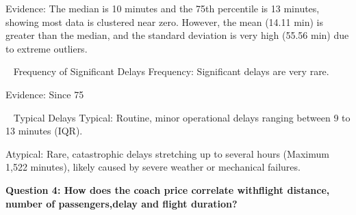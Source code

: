 \documentclass[11pt,a4paper]{article}
\begin{document}
Evidence: The median is 10 minutes and the 75th percentile is 13 minutes, showing most data is clustered near zero. However, the mean (14.11 min) is greater than the median, and the standard deviation is very high (55.56 min) due to extreme outliers.

~ Frequency of Significant Delays
Frequency: Significant delays are very rare.

Evidence: Since 75%

~ Typical Delays
Typical: Routine, minor operational delays ranging between 9 to 13 minutes (IQR).

Atypical: Rare, catastrophic delays stretching up to several hours (Maximum 1,522 minutes), likely caused by severe weather or mechanical failures.
\vspace{2.5em}

\noindent \textbf{\large Question 4: 
How does the coach price correlate withflight distance, number of passengers,delay and flight duration?}
\end{document}
